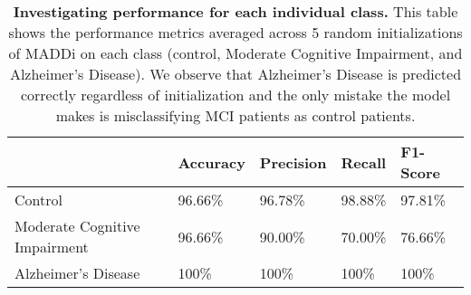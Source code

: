 \documentclass[11pt]{article}
\begin{document}
\begin{table}[H]
\begin{center}
\caption{\textbf{Investigating performance for each individual class.} This table shows the performance metrics averaged across 5 random initializations of MADDi on each class (control, Moderate Cognitive Impairment, and Alzheimer's Disease). We observe that Alzheimer's Disease is predicted correctly regardless of initialization and the only mistake the model makes is misclassifying MCI patients as control patients.}\label{tab:classes}
\begin{tabular}{|l|l|l|l|l|}
\hline
                              & \textbf{Accuracy} & \textbf{Precision} & \textbf{Recall} & \textbf{F1-Score} \\ \hline
Control                       & 96.66\%           & 96.78\%            & 98.88\%         & 97.81\%           \\ \hline
Moderate Cognitive Impairment & 96.66\%           & 90.00\%            & 70.00\%         & 76.66\%           \\ \hline
Alzheimer's Disease           & 100\%             & 100\%              & 100\%           & 100\%             \\ \hline
\end{tabular}
\end{center}
\end{table}
        
\end{document}
